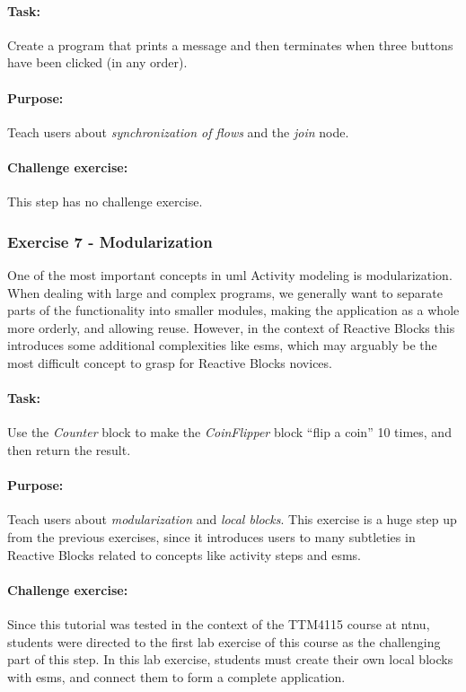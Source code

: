 \paragraph{Task:} Create a program that prints a message and then terminates when three buttons have been clicked (in any order).

\paragraph{Purpose:} Teach users about \emph{synchronization of flows} and the \emph{join} node.

\paragraph{Challenge exercise:} This step has no challenge exercise.

\subsubsection{Exercise 7 - Modularization}
One of the most important concepts in \gls{uml} Activity modeling is modularization. When dealing with large and complex programs, we generally want to separate parts of the functionality into smaller modules, making the application as a whole more orderly, and allowing reuse. However, in the context of Reactive Blocks this introduces some additional complexities like \glspl{esm}, which may arguably be the most difficult concept to grasp for Reactive Blocks novices.

\paragraph{Task:} Use the \emph{Counter} block to make the \emph{CoinFlipper} block ``flip a coin'' 10 times, and then return the result.

\paragraph{Purpose:} Teach users about \emph{modularization} and \emph{local blocks}. This exercise is a huge step up from the previous exercises, since it introduces users to many subtleties in Reactive Blocks related to concepts like activity steps and \glspl{esm}.

\paragraph{Challenge exercise:} Since this tutorial was tested in the context of the TTM4115 course at \gls{ntnu}, students were directed to the first lab exercise of this course as the challenging part of this step. In this lab exercise, students must create their own local blocks with \glspl{esm}, and connect them to form a complete application.

